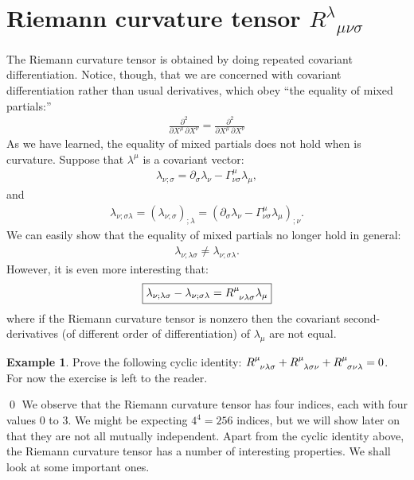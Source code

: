 \documentclass{book}
\theoremstyle{definition}
\newtheorem{exmp}{Example}[section]
\begin{document}
\section{Riemann curvature tensor $R^{\lambda}_{\text{ }\mu\nu\sigma}$}
The Riemann curvature tensor is obtained by doing repeated covariant differentiation. Notice, though, that we are concerned with covariant differentiation rather than usual derivatives, which obey ``the equality of mixed partials:''
\begin{align*}
\frac{\partial^2}{\partial X^\mu\,\partial X^\nu} = \frac{\partial^2}{\partial X^\mu\, \partial X^\nu}
\end{align*}
As we have learned, the equality of mixed partials does not hold when is curvature. Suppose that $\lambda^\mu$ is a covariant vector:
\begin{align*}
\lambda_{\nu;\sigma} = \partial_\sigma \lambda_\nu - \Gamma^\mu_{\nu\sigma}\lambda_\mu,
\end{align*}
and 
\begin{align*}
\lambda_{\nu;\sigma\lambda} = \left(\lambda_{\nu;\sigma} \right)_{;\lambda} = \left(\partial_\sigma \lambda_\nu - \Gamma^\mu_{\nu\sigma}\lambda_\mu  \right)_{;\nu}.
\end{align*}
We can easily show that the equality of mixed partials no longer hold in general:
\begin{align*}
\lambda_{\nu;\lambda\sigma} \neq \lambda_{\nu;\sigma\lambda}.
\end{align*}
However, it is even more interesting that:
\begin{align*}
\boxed{\lambda_{\nu;\lambda\sigma} - \lambda_{\nu;\sigma\lambda} = \tensor{R}{^{\mu}_{\nu\lambda\sigma}}\lambda_\mu}
\end{align*}
where if the Riemann curvature tensor is nonzero then the covariant second-derivatives (of different order of differentiation) of $\lambda_\mu$ are not equal. \\

\begin{exmp}
	Prove the following cyclic identity:	$\tensor{R}{^{\mu}_{\nu\lambda\sigma}} + \tensor{R}{^{\mu}_{\lambda\sigma\nu}} + \tensor{R}{^{\mu}_{\sigma\nu\lambda}} = 0$.\\
	
	For now the exercise is left to the reader. 
\end{exmp}\qed
We observe that the Riemann curvature tensor has four indices, each with four values 0 to 3. We might be expecting $4^4 = 256$ indices, but we will show later on that they are not all mutually independent. Apart from the cyclic identity above, the Riemann curvature tensor has a number of interesting properties. We shall look at some important ones.\\
\end{document}
